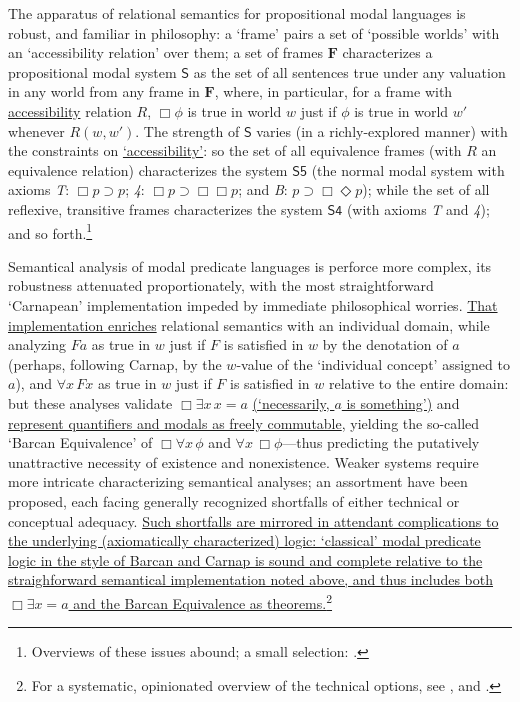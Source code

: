 \documentclass[12pt]{article}
\begin{document}
The apparatus of relational semantics for propositional modal languages is
robust, and familiar in philosophy: a `frame' pairs a set of `possible worlds'
with an `accessibility relation' over them; a set of frames $\mathbf{F}$
characterizes a propositional modal system $\mathsf{S}$ as the set of all
sentences true under any valuation in any world from any frame in
$\mathbf{F}$, where, in particular, for a frame with \ul{accessibility} 
relation $R$, $\Box\phi$
is true in world $w$ just if $\phi$ is true in world $w'$ whenever $R(w, w')$.
The strength of $\mathsf{S}$ varies (in a richly-explored manner) with the
constraints on \ul{`accessibility'}: so the set of all equivalence frames (with $R$ an
equivalence relation) characterizes the system $\mathsf{S5}$ (the normal modal
system with axioms \emph{T}: $\Box p \supset p$; \emph{4}: $\Box p \supset
\Box\Box p$; and \emph{B}:  $p \supset \Box\Diamond p$); while the set of all
reflexive, transitive frames characterizes the system $\mathsf{S4}$ (with
axioms \emph{T} and \emph{4}); and so forth.\footnote{Overviews of these
issues abound; a small selection:
\citep{chellas80,Cresswell1996-CREANI-3,blackburn-ml}.} 

Semantical analysis of modal predicate languages is perforce more complex, its
robustness attenuated proportionately, with the most straightforward
`Carnapean' implementation impeded by immediate philosophical worries. \ul{That
implementation enriches} relational semantics with an individual domain, while
analyzing $Fa$ as true in $w$ just if $F$ is satisfied in $w$ by the
denotation of $a$ (perhaps, following Carnap, by the $w$-value of the
`individual concept' assigned to $a$), and $\forall x\,Fx$ as true in $w$ just
if $F$ is satisfied in $w$ relative to the entire domain: but these analyses
validate $\Box\exists x\,x = a$ \ul{(`necessarily, $a$ is something')} and
\ul{represent quantifiers and modals as freely commutable}, yielding the
so-called `Barcan Equivalence' of $\Box\forall x\,\phi$ and $\forall
x\,\Box\phi$---thus predicting the putatively unattractive necessity of
existence and nonexistence. Weaker systems require more intricate
characterizing semantical analyses; an assortment have been proposed, each
facing generally recognized shortfalls of either technical or conceptual
adequacy. \ul{Such shortfalls are mirrored in attendant complications to the
underlying (axiomatically characterized) logic: `classical' modal predicate
logic in the style of Barcan and Carnap is sound and complete relative to the
straighforward semantical implementation noted above, and thus includes both
$\Box\exists x = a$ and the Barcan Equivalence as theorems.}\footnote{For a
systematic, opinionated overview of the technical options, see
\citep{garson84,Garson2005-GARUQM-2,Garson2006-GARMLF}, and \citep[Ch.\
3]{Williamson2013-WILMLA-2}.} 
\end{document}
